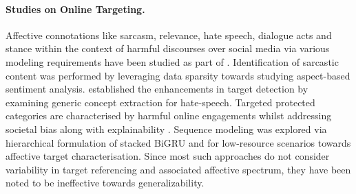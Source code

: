 \documentclass[11pt]{article}
\begin{document}
\paragraph{\bf Studies on Online Targeting.}
Affective connotations like sarcasm, relevance, hate speech, dialogue acts and stance within the context of harmful discourses over social media via various modeling requirements have been studied as part of \cite{zain2017,Gautam_Mathur_Gosangi_Mahata_Sawhney_Shah_2020,ousidhoum-etal-2019-multilingual}. 
Identification of sarcastic content was performed by leveraging data sparsity \cite{Zainuddin2019HateCO} towards studying aspect-based sentiment analysis. \citet{shvets-etal-2021-targets} established the enhancements in target detection by examining generic concept extraction for hate-speech. Targeted protected categories are characterised by harmful online engagements whilst addressing societal bias along with explainability \cite{sap-etal-2020-social,mathew2020hatexplain}.
Sequence modeling was explored via hierarchical formulation of stacked BiGRU \cite{ma-etal-2018-joint} and for low-resource scenarios \cite{mitchell-etal-2013-open} towards affective target characterisation. 
Since most such approaches do not consider variability in target referencing and associated affective spectrum, they have been noted \cite{shvets-etal-2021-targets} to be ineffective towards generalizability.
\end{document}
